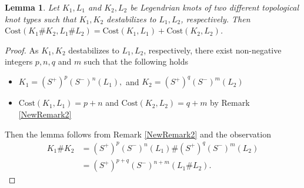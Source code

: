 \documentclass[11pt]{amsart}
\numberwithin{equation}{section}
\theoremstyle{plain}
\newtheorem{Lemma}[equation]{Lemma}
\theoremstyle{definition}
\theoremstyle{remark} \newtheorem{remark}[equation]{Remark}
\theoremstyle{remark} \newtheorem{observation}[equation]{Observation}
\newcommand{\Cost}{\text{Cost}}
\begin{document}
\begin{Lemma}\label{CostL20}
    Let $K_1,L_1$ and $K_2,L_2$ be Legendrian knots of two different topological knot types such that $K_1, K_2$ destabilizes to $ L_1,L_2$, respectively. Then $\Cost(K_1\#K_2,L_1\#L_2)=\Cost(K_1,L_1)+\Cost(K_2,L_2)$.  
\end{Lemma}
\begin{proof}
As $K_1, K_2$ destabilizes to $ L_1,L_2$, respectively, there exist non-negative integers $p,n,q$ and $m$ such that the following holds
 \begin{itemize}
     \item $K_1=(S^+)^p(S^-)^n(L_1),$ and $ K_2=(S^+)^{q}(S^-)^m(L_2)$
     \item $\Cost (K_1, L_1) = p+n$ and $\Cost(K_2, L_2)=q+m$ by Remark \ref{NewRemark2}
 \end{itemize} 
 Then the lemma follows from Remark \ref{NewRemark2} and the observation 
 \begin{align*}
     K_1\#K_2&=(S^+)^p(S^-)^n(L_1)\#(S^+)^{q}(S^-)^m(L_2)\\
     &=(S^+)^{p+q}(S^-)^{n+m}(L_1\#L_2).
 \end{align*}

\end{proof}
\end{document}
